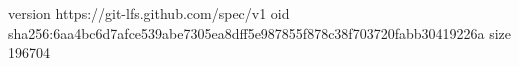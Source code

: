 version https://git-lfs.github.com/spec/v1
oid sha256:6aa4bc6d7afce539abe7305ea8dff5e987855f878c38f703720fabb30419226a
size 196704
